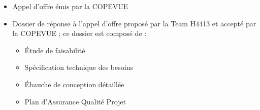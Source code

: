 \begin{itemize}
\item Appel d'offre émis par la COPEVUE
\item Dossier de réponse à l'appel d'offre proposé par la Team H4413 et
accepté par la COPEVUE ; ce dossier est composé de :
    \begin{itemize}
    \item Étude de faisabilité
    \item Spécification technique des besoins
    \item Ébauche de conception détaillée
    \item Plan d'Assurance Qualité Projet
    \end{itemize}
\end{itemize}


